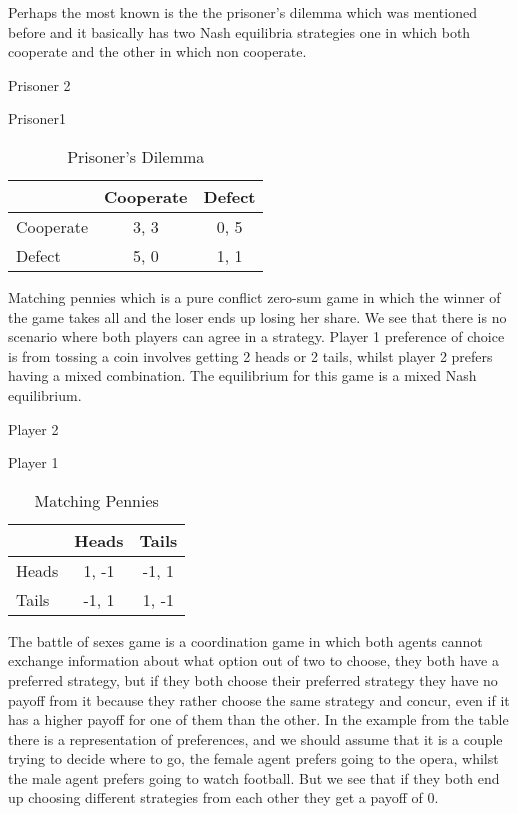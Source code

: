 \documentclass{book}
\begin{document}
Perhaps the most known is the the prisoner's dilemma which was mentioned before and it basically has two Nash equilibria strategies one in which both cooperate and the other in which non cooperate.

\begin{table}[h]
\begin{center}
Prisoner 2

Prisoner1
\begin{tabular}{|l|c|c|}
\hline
 & Cooperate & Defect \\ 
\hline
Cooperate & 3, 3 & 0, 5\\
\hline
 Defect & 5, 0 & 1, 1\\
\hline
\end{tabular}
\caption{Prisoner's Dilemma}
\label{tab:prisdiltag}
\end{center}
\end{table}


Matching pennies which is a pure conflict zero-sum game in which the winner of the game takes all and the loser ends up losing her share. We see that there is no scenario where both players can agree in a strategy. Player 1 preference of choice is from tossing a coin involves getting 2 heads or 2 tails, whilst player 2 prefers having a mixed combination.  The equilibrium for this game is a mixed Nash equilibrium.

\begin{table}[h]
\begin{center}
Player 2


Player 1
\begin{tabular}{|l|c|c|}
\hline
 & Heads & Tails \\ 
\hline
Heads & 1, -1 & -1, 1\\
\hline
 Tails & -1, 1 & 1, -1\\
\hline
\end{tabular}
\end{center}
\caption{Matching Pennies}
\label{tab:matpentag}
\end{table}


The battle of sexes game is a coordination game in which both agents cannot exchange information about what option out of two to choose, they both have a preferred strategy, but if they both choose their preferred strategy they have no payoff from it because they rather choose the same strategy and concur,  even if it has a higher payoff for one of them than the other. In the example from the table there is a representation of preferences, and we should assume that it is a couple trying to decide where to go, the female agent prefers going to the opera, whilst the male agent prefers going to watch football. But we see that if they both end up choosing different strategies from each other they get a payoff of 0. 
\end{document}
